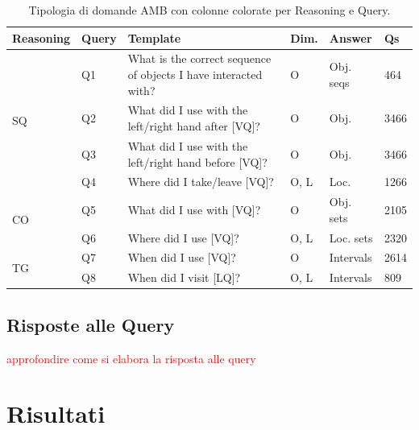 \begin{table}[ht]
    \centering
    \scriptsize %
    \setlength{\tabcolsep}{4pt} %
    \begin{tabular}{|p{1.8cm}|p{1cm}|p{7.5cm}|p{1cm}|p{1.5cm}|p{1cm}|}
    \hline
    \textbf{Reasoning} & \textbf{Query} & \textbf{Template} & \textbf{Dim.} & \textbf{Answer} & \textbf{Qs} \\
    \hline
    \multirow{4}{*}{\textcolor[HTML]{789ECC}{SQ}} & \textcolor[HTML]{789ECC}{Q1} & What is the correct sequence of objects I have interacted with? & O & Obj. seqs & 464 \\
    \cline{2-6}
    & \textcolor[HTML]{789ECC}{Q2} & What did I use with the left/right hand after [VQ]? & O & Obj. & 3466 \\
    \cline{2-6}
    & \textcolor[HTML]{789ECC}{Q3} & What did I use with the left/right hand before [VQ]? & O & Obj. & 3466 \\
    \cline{2-6}
    & \textcolor[HTML]{789ECC}{Q4} & Where did I take/leave [VQ]? & O, L & Loc. & 1266 \\
    \hline
    \multirow{2}{*}{\textcolor[HTML]{C23A21}{CO}} & \textcolor[HTML]{C23A21}{Q5} & What did I use with [VQ]? & O & Obj. sets & 2105 \\
    \cline{2-6}
    & \textcolor[HTML]{C23A21}{Q6} & Where did I use [VQ]? & O, L & Loc. sets & 2320 \\
    \hline
    \multirow{2}{*}{\textcolor[HTML]{02BF3D}{TG}} & \textcolor[HTML]{02BF3D}{Q7} & When did I use [VQ]? & O & Intervals & 2614 \\
    \cline{2-6}
    & \textcolor[HTML]{02BF3D}{Q8} & When did I visit [LQ]? & O, L & Intervals & 809 \\
    \hline
    \end{tabular}
    \caption{Tipologia di domande AMB con colonne colorate per Reasoning e Query.}
    \label{tab:amb_queries_colored}
\end{table}    

\subsection{Risposte alle Query}
\textcolor{red}{approfondire come si elabora la risposta alle query}

\section{Risultati}

